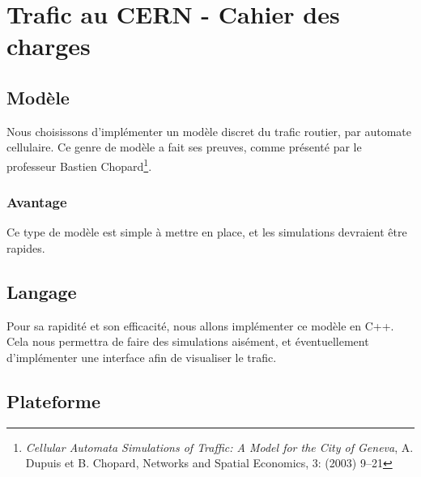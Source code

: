 \documentclass[a4paper,10pt]{extarticle}
\begin{document}
\pagestyle{fancy}
\renewcommand{\headheight}{24pt}
\rhead{\today}


\section*{Trafic au CERN - Cahier des charges}

\subsection*{Modèle}

Nous choisissons d'implémenter un modèle discret du trafic routier, par automate cellulaire. Ce genre de modèle a fait ses preuves, comme présenté par le professeur Bastien Chopard\footnote{\emph{Cellular Automata Simulations of Traffic:
A Model for the City of Geneva}, A. Dupuis et B. Chopard, Networks and Spatial Economics, 3: (2003) 9–21}.

\subsubsection*{Avantage}

Ce type de modèle est simple à mettre en place, et les simulations devraient être rapides.

\subsection*{Langage}

Pour sa rapidité et son efficacité, nous allons implémenter ce modèle en C++. Cela nous permettra de faire des simulations aisément, et éventuellement d'implémenter une interface afin de visualiser le trafic.

\subsection*{Plateforme}
\end{document}
